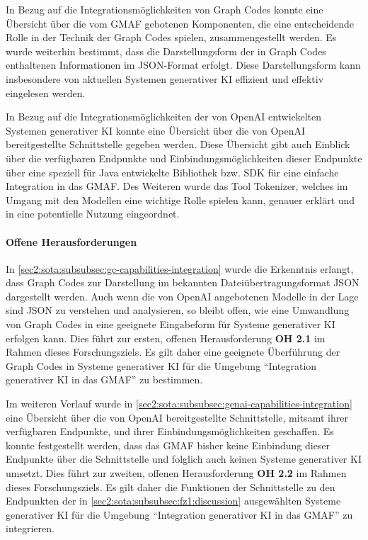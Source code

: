In Bezug auf die Integrationsmöglichkeiten von Graph Codes konnte eine Übersicht über die vom GMAF gebotenen Komponenten, die eine entscheidende Rolle in der Technik der Graph Codes spielen, zusammengestellt werden.
Es wurde weiterhin bestimmt, dass die Darstellungsform der in Graph Codes enthaltenen Informationen im JSON-Format erfolgt.
Diese Darstellungsform kann insbesondere von aktuellen Systemen generativer KI effizient und effektiv eingelesen werden.

In Bezug auf die Integrationsmöglichkeiten der von OpenAI entwickelten Systemen generativer KI konnte eine Übersicht über die von OpenAI bereitgestellte Schnittstelle gegeben werden.
Diese Übersicht gibt auch Einblick über die verfügbaren Endpunkte und Einbindungsmöglichkeiten dieser Endpunkte über eine speziell für Java entwickelte Bibliothek bzw. SDK für eine einfache Integration in das GMAF.
Des Weiteren wurde das Tool Tokenizer, welches im Umgang mit den Modellen eine wichtige Rolle spielen kann, genauer erklärt und in eine potentielle Nutzung eingeordnet. 

\paragraph{Offene Herausforderungen}
\label{sec2:sota:par:fz2:open-challenges}
In \cref{sec2:sota:subsubsec:gc-capabilities-integration} wurde die Erkenntnis erlangt, dass Graph Codes zur Darstellung im bekannten Dateiübertragungsformat JSON dargestellt werden.
Auch wenn die von OpenAI angebotenen Modelle in der Lage sind JSON zu verstehen und analysieren, so bleibt offen, wie eine Umwandlung von Graph Codes in eine geeignete Eingabeform für Systeme generativer KI erfolgen kann.
Dies führt zur ersten, offenen Herausforderung \textbf{OH 2.1} im Rahmen dieses Forschungsziels.
Es gilt daher eine geeignete Überführung der Graph Codes in Systeme generativer KI für die Umgebung \enquote{Integration generativer KI in das GMAF} zu bestimmen.

Im weiteren Verlauf wurde in \cref{sec2:sota:subsubsec:genai-capabilities-integration} eine Übersicht über die von OpenAI bereitgestellte Schnittstelle, mitsamt ihrer verfügbaren Endpunkte, und ihrer Einbindungsmöglichkeiten geschaffen.
Es konnte festgestellt werden, dass das GMAF bisher keine Einbindung dieser Endpunkte über die Schnittstelle und folglich auch keinen Systeme generativer KI umsetzt.
Dies führt zur zweiten, offenen Herausforderung \textbf{OH 2.2} im Rahmen dieses Forschungsziels.
Es gilt daher die Funktionen der Schnittstelle zu den Endpunkten der in \cref{sec2:sota:subsubsec:fz1:discussion} ausgewählten Systeme generativer KI für die Umgebung \enquote{Integration generativer KI in das GMAF} zu integrieren.

